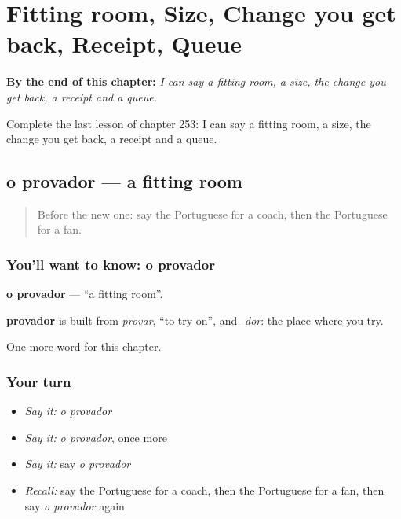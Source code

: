 
\chapter{Fitting room, Size, Change you get back, Receipt, Queue}
\label{ch:pt-fitting-room-size-change-you-get-back-receipt-queue}

\begin{chapteropening}
\textbf{By the end of this chapter:} \emph{I can say a fitting room, a size, the change you get back, a receipt and a queue.}

Complete the last lesson of chapter 253: I can say a fitting room, a size, the change you get back, a receipt and a queue.
\end{chapteropening}

\section[o provador]{o provador — a fitting room}

\label{lesson:PT-C253-provador}



\begin{quote}
Before the new one: say the Portuguese for a coach, then the Portuguese for a fan.
\end{quote}

\subsection*{You'll want to know: o provador}
\textbf{o provador} — \textquotedblleft{}a fitting room\textquotedblright{}.

\begin{cousinweb}
\textbf{provador} is built from \emph{provar}, \textquotedblleft{}to try on\textquotedblright{}, and \emph{-dor}: the place where you try.
\end{cousinweb}

\begin{grammarlens}[title={What you've built}]
One more word for this chapter.
\end{grammarlens}

\subsection*{Your turn}
\begin{itemize}
\raggedright
  \item \emph{Say it:} \emph{o provador}
  \item \emph{Say it:} \emph{o provador}, once more
  \item \emph{Say it:} say \emph{o provador}
  \item \emph{Recall:} say the Portuguese for a coach, then the Portuguese for a fan, then say \emph{o provador} again
\end{itemize}

